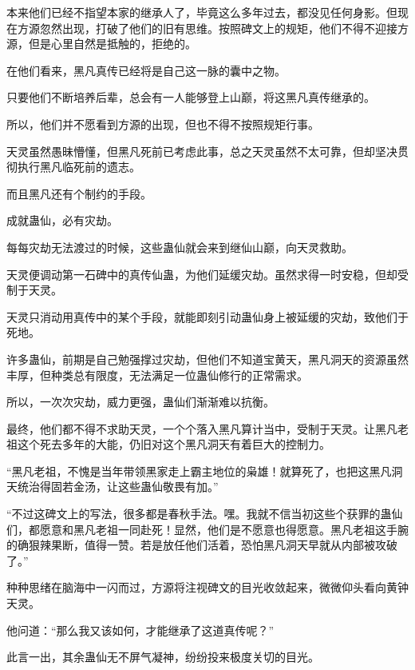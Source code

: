 \begin{this_body}
本来他们已经不指望本家的继承人了，毕竟这么多年过去，都没见任何身影。但现在方源忽然出现，打破了他们的旧有思维。按照碑文上的规矩，他们不得不迎接方源，但是心里自然是抵触的，拒绝的。

在他们看来，黑凡真传已经将是自己这一脉的囊中之物。

只要他们不断培养后辈，总会有一人能够登上山巅，将这黑凡真传继承的。

所以，他们并不愿看到方源的出现，但也不得不按照规矩行事。

天灵虽然愚昧懵懂，但黑凡死前已考虑此事，总之天灵虽然不太可靠，但却坚决贯彻执行黑凡临死前的遗志。

而且黑凡还有个制约的手段。

成就蛊仙，必有灾劫。

每每灾劫无法渡过的时候，这些蛊仙就会来到继仙山巅，向天灵救助。

天灵便调动第一石碑中的真传仙蛊，为他们延缓灾劫。虽然求得一时安稳，但却受制于天灵。

天灵只消动用真传中的某个手段，就能即刻引动蛊仙身上被延缓的灾劫，致他们于死地。

许多蛊仙，前期是自己勉强撑过灾劫，但他们不知道宝黄天，黑凡洞天的资源虽然丰厚，但种类总有限度，无法满足一位蛊仙修行的正常需求。

所以，一次次灾劫，威力更强，蛊仙们渐渐难以抗衡。

最终，他们都不得不求助天灵，一个个落入黑凡算计当中，受制于天灵。让黑凡老祖这个死去多年的大能，仍旧对这个黑凡洞天有着巨大的控制力。

“黑凡老祖，不愧是当年带领黑家走上霸主地位的枭雄！就算死了，也把这黑凡洞天统治得固若金汤，让这些蛊仙敬畏有加。”

“不过这碑文上的写法，很多都是春秋手法。嘿。我就不信当初这些个获罪的蛊仙们，都愿意和黑凡老祖一同赴死！显然，他们是不愿意也得愿意。黑凡老祖这手腕的确狠辣果断，值得一赞。若是放任他们活着，恐怕黑凡洞天早就从内部被攻破了。”

种种思绪在脑海中一闪而过，方源将注视碑文的目光收敛起来，微微仰头看向黄钟天灵。

他问道：“那么我又该如何，才能继承了这道真传呢？”

此言一出，其余蛊仙无不屏气凝神，纷纷投来极度关切的目光。

\end{this_body}

